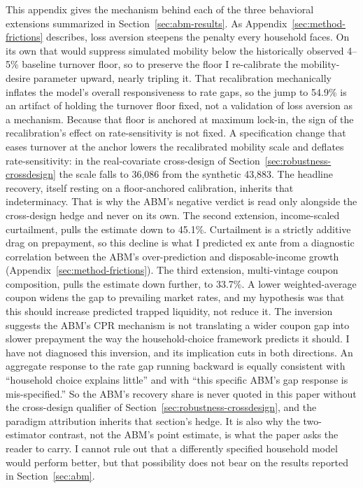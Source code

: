 \documentclass[12pt]{article}
\begin{document}
This appendix gives the mechanism behind each of the three behavioral extensions summarized in Section~\ref{sec:abm-results}. As Appendix~\ref{sec:method-frictions} describes, loss aversion steepens the penalty every household faces. On its own that would suppress simulated mobility below the historically observed 4--5\% baseline turnover floor, so to preserve the floor I re-calibrate the mobility-desire parameter upward, nearly tripling it. That recalibration mechanically inflates the model's overall responsiveness to rate gaps, so the jump to 54.9\% is an artifact of holding the turnover floor fixed, not a validation of loss aversion as a mechanism. Because that floor is anchored at maximum lock-in, the sign of the recalibration's effect on rate-sensitivity is not fixed. A specification change that eases turnover at the anchor lowers the recalibrated mobility scale and deflates rate-sensitivity: in the real-covariate cross-design of Section~\ref{sec:robustness-crossdesign} the scale falls to 36,086 from the synthetic 43,883. The headline recovery, itself resting on a floor-anchored calibration, inherits that indeterminacy. That is why the ABM's negative verdict is read only alongside the cross-design hedge and never on its own. The second extension, income-scaled curtailment, pulls the estimate down to 45.1\%. Curtailment is a strictly additive drag on prepayment, so this decline is what I predicted ex ante from a diagnostic correlation between the ABM's over-prediction and disposable-income growth (Appendix~\ref{sec:method-frictions}). The third extension, multi-vintage coupon composition, pulls the estimate down further, to 33.7\%. A lower weighted-average coupon widens the gap to prevailing market rates, and my hypothesis was that this should increase predicted trapped liquidity, not reduce it. The inversion suggests the ABM's CPR mechanism is not translating a wider coupon gap into slower prepayment the way the household-choice framework predicts it should. I have not diagnosed this inversion, and its implication cuts in both directions. An aggregate response to the rate gap running backward is equally consistent with ``household choice explains little'' and with ``this specific ABM's gap response is mis-specified.'' So the ABM's recovery share is never quoted in this paper without the cross-design qualifier of Section~\ref{sec:robustness-crossdesign}, and the paradigm attribution inherits that section's hedge. It is also why the two-estimator contrast, not the ABM's point estimate, is what the paper asks the reader to carry. I cannot rule out that a differently specified household model would perform better, but that possibility does not bear on the results reported in Section~\ref{sec:abm}.
\end{document}
